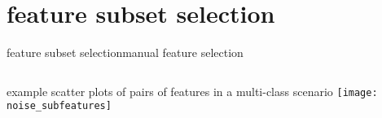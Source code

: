     \section[selection]{feature subset selection}
		\begin{frame}{feature subset selection}{manual feature selection}
            \begin{columns}[T]
                example scatter plots of pairs of features in a multi-class scenario
                    \texttt{[image: noise\_subfeatures]}
            \end{columns}
		\end{frame}
        
